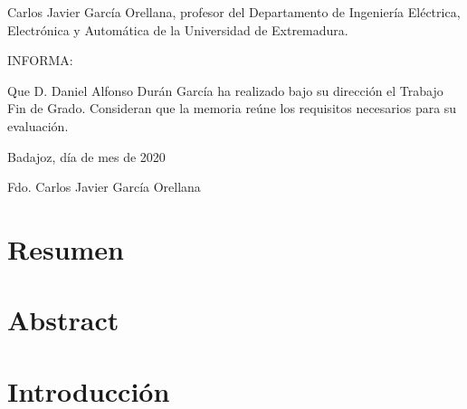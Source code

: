 \documentclass[11pt,usenames,dvipsnames,a4paper,twoside]{article}
\begin{document}


\shipout\null %

\pagestyle{empty}
\vspace*{5cm}

Carlos Javier García Orellana, profesor del
Departamento de Ingeniería Eléctrica, Electrónica y Automática de la Universidad de
Extremadura.

INFORMA:

Que D. Daniel Alfonso Durán García ha realizado
bajo su dirección el Trabajo Fin de Grado. Consideran que la memoria reúne
los requisitos necesarios para su evaluación.

\vspace*{1cm}
\begin{center}
Badajoz, día de mes de 2020


\vspace{5cm}
Fdo. Carlos Javier García Orellana
\end{center}

\newpage %
\setcounter{page}{1}
\pagestyle{plain}

\tableofcontents



\newpage
\section{Resumen}


\newpage
\section{Abstract}


\newpage
\section{Introducción}
\end{document}

